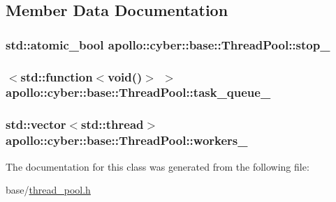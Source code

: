 \subsection{Member Data Documentation}
\hypertarget{classapollo_1_1cyber_1_1base_1_1ThreadPool_a3ac78b38d2357e302782b269eb418a13}{
\subsubsection[{stop\-\_\-}]{\setlength{\rightskip}{0pt plus 5cm}std\-::atomic\-\_\-bool apollo\-::cyber\-::base\-::\-Thread\-Pool\-::stop\-\_\-\hspace{0.3cm}{\ttfamily [private]}}}\label{classapollo_1_1cyber_1_1base_1_1ThreadPool_a3ac78b38d2357e302782b269eb418a13}
\hypertarget{classapollo_1_1cyber_1_1base_1_1ThreadPool_a8a22cf996a6d9584df9b134fbefc8871}{
\subsubsection[{task\-\_\-queue\-\_\-}]{$<$std\-::function$<$void()$>$ $>$ apollo\-::cyber\-::base\-::\-Thread\-Pool\-::task\-\_\-queue\-\_\-\hspace{0.3cm}{\ttfamily [private]}}}\label{classapollo_1_1cyber_1_1base_1_1ThreadPool_a8a22cf996a6d9584df9b134fbefc8871}
\hypertarget{classapollo_1_1cyber_1_1base_1_1ThreadPool_acced081f4cd5b01eb8fc445d5c628ca6}{
\subsubsection[{workers\-\_\-}]{\setlength{\rightskip}{0pt plus 5cm}std\-::vector$<$std\-::thread$>$ apollo\-::cyber\-::base\-::\-Thread\-Pool\-::workers\-\_\-\hspace{0.3cm}{\ttfamily [private]}}}\label{classapollo_1_1cyber_1_1base_1_1ThreadPool_acced081f4cd5b01eb8fc445d5c628ca6}


The documentation for this class was generated from the following file\-:\begin{DoxyCompactItemize}
\item 
base/\hyperlink{thread__pool_8h}{thread\-\_\-pool.\-h}\end{DoxyCompactItemize}

